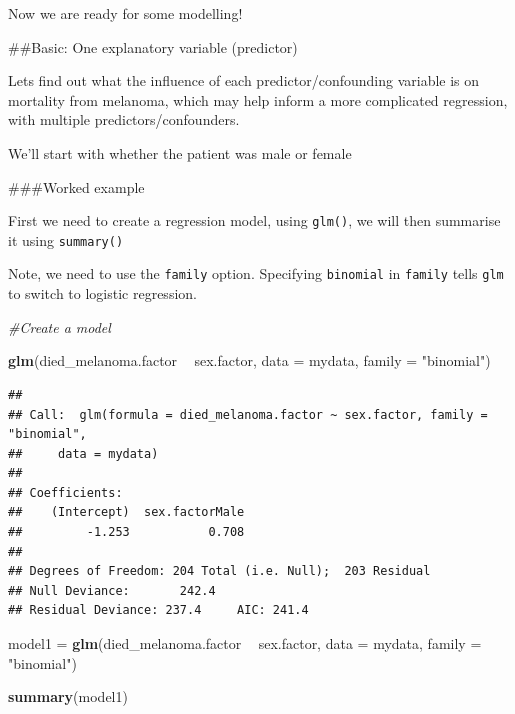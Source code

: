 \documentclass[]{book}
\makeatletter
\newenvironment{Shaded}{\begin{snugshade}}{\end{snugshade}}
\newcommand{\CommentTok}[1]{\textcolor[rgb]{0.56,0.35,0.01}{\textit{#1}}}
\newcommand{\DataTypeTok}[1]{\textcolor[rgb]{0.13,0.29,0.53}{#1}}
\newcommand{\KeywordTok}[1]{\textcolor[rgb]{0.13,0.29,0.53}{\textbf{#1}}}
\newcommand{\NormalTok}[1]{#1}
\newcommand{\OperatorTok}[1]{\textcolor[rgb]{0.81,0.36,0.00}{\textbf{#1}}}
\newcommand{\StringTok}[1]{\textcolor[rgb]{0.31,0.60,0.02}{#1}}
\newenvironment{kframe}{%
\medskip{}
\setlength{\fboxsep}{.8em}
 \def\at@end@of@kframe{}%
 \ifinner\ifhmode%
  \def\at@end@of@kframe{\end{minipage}}%
  \begin{minipage}{\columnwidth}%
 \fi\fi%
 \def\FrameCommand##1{\hskip\@totalleftmargin \hskip-\fboxsep
 \colorbox{shadecolor}{##1}\hskip-\fboxsep
     \hskip-\linewidth \hskip-\@totalleftmargin \hskip\columnwidth}%
 \MakeFramed {\advance\hsize-\width
   \@totalleftmargin\z@ \linewidth\hsize
   \@setminipage}}%
 {\par\unskip\endMakeFramed%
 \at@end@of@kframe}
\renewenvironment{Shaded}{\begin{kframe}}{\end{kframe}}
\theoremstyle{definition}
\theoremstyle{definition}
\theoremstyle{definition}
\theoremstyle{remark}
\makeatother
\begin{document}
Now we are ready for some modelling!

\#\#Basic: One explanatory variable (predictor)

Lets find out what the influence of each predictor/confounding variable
is on mortality from melanoma, which may help inform a more complicated
regression, with multiple predictors/confounders.

We'll start with whether the patient was male or female

\#\#\#Worked example

First we need to create a regression model, using \texttt{glm()}, we
will then summarise it using \texttt{summary()}

Note, we need to use the \texttt{family} option. Specifying
\texttt{\textquotesingle{}binomial\textquotesingle{}} in \texttt{family}
tells \texttt{glm} to switch to logistic regression.

\begin{Shaded}
\begin{Highlighting}[]
\CommentTok{#Create a model}

\KeywordTok{glm}\NormalTok{(died_melanoma.factor }\OperatorTok{~}\StringTok{ }\NormalTok{sex.factor, }\DataTypeTok{data =}\NormalTok{ mydata, }\DataTypeTok{family =} \StringTok{"binomial"}\NormalTok{)}
\end{Highlighting}
\end{Shaded}

\begin{verbatim}
## 
## Call:  glm(formula = died_melanoma.factor ~ sex.factor, family = "binomial", 
##     data = mydata)
## 
## Coefficients:
##    (Intercept)  sex.factorMale  
##         -1.253           0.708  
## 
## Degrees of Freedom: 204 Total (i.e. Null);  203 Residual
## Null Deviance:       242.4 
## Residual Deviance: 237.4     AIC: 241.4
\end{verbatim}

\begin{Shaded}
\begin{Highlighting}[]
\NormalTok{model1 =}\StringTok{ }\KeywordTok{glm}\NormalTok{(died_melanoma.factor }\OperatorTok{~}\StringTok{ }\NormalTok{sex.factor, }\DataTypeTok{data =}\NormalTok{ mydata, }\DataTypeTok{family =} \StringTok{"binomial"}\NormalTok{)}

\KeywordTok{summary}\NormalTok{(model1)}
\end{Highlighting}
\end{Shaded}
\end{document}
